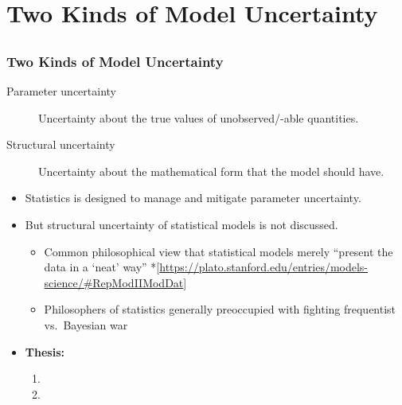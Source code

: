 \documentclass{philslides}
\begin{document}
\section{Two Kinds of Model Uncertainty}
\subsection*{}

\frame
{
	\frametitle{Two Kinds of Model Uncertainty}
	\begin{description}
		\item[Parameter uncertainty] Uncertainty about the true values of unobserved/-able quantities.  
		\item[Structural uncertainty] Uncertainty about the mathematical form that the model should have.  \autocite[265]{Parker2010}
	\end{description}
	\pause
	\begin{itemize}
		\item Statistics is designed to manage and mitigate parameter uncertainty.  
		\pause
		\item But structural uncertainty of statistical models is not discussed.
			\begin{itemize}
			\item Common philosophical view that statistical models merely ``present the data in a `neat' way'' *[\url{https://plato.stanford.edu/entries/models-science/\#RepModIIModDat}]
			\item Philosophers of statistics generally preoccupied with fighting frequentist vs.~Bayesian war
			\end{itemize}
		\pause
		\item \textbf{Thesis:} 
			\begin{enumerate}
			\item {}
			\item {}
			\end{enumerate}
	\end{itemize}
}
\end{document}
